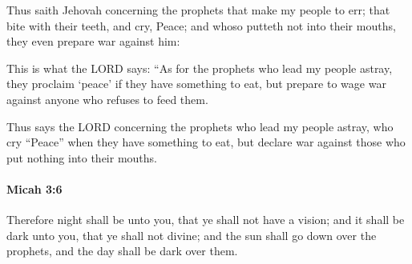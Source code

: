 			\begin{versebox}
					\item[BHS] 
					\item[LXX] 
					\item[ASV] Thus saith Jehovah concerning the prophets that make my people to err; that bite with their teeth, and cry, Peace; and whoso putteth not into their mouths, they even prepare war against him:
					\item[NIV] This is what the LORD says: “As for the prophets who lead my people astray, they proclaim ‘peace’ if they have something to eat, but prepare to wage war against anyone who refuses to feed them.
					\item[NRSV] Thus says the LORD concerning the prophets who lead my people astray, who cry “Peace” when they have something to eat, but declare war against those who put nothing into their mouths.
			\end{versebox}

		\paragraph{Micah 3:6} %
			\label{MICAH-3-6}

			Therefore night shall be unto you, that ye shall not have a vision; and it shall be dark unto you, that ye shall not divine; and the sun shall go down over the prophets, and the day shall be dark over them.

